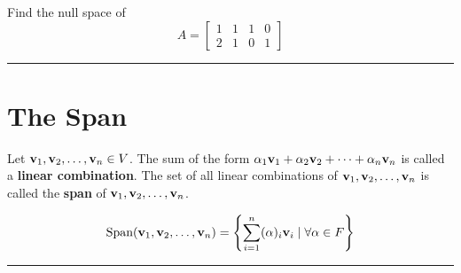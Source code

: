 \begin{example}
Find the null space of 
\[  
A = \begin{bmatrix}
1 & 1 & 1 & 0\\ 2 & 1 & 0 & 1
\end{bmatrix}
 \]

 \end{example}
	
	 
\rule[0.01in]{\textwidth}{0.0025in}


 









\section{The Span}

  \begin{definition}
Let ${\bf v}_1, {\bf v}_2, \dots, {\bf v}_n  \in V$.  The sum of the form $\alpha_1 {\bf v}_1 +  \alpha_2 {\bf v}_2 +  \cdots + \alpha_n {\bf v}_n$ is called a \textbf{linear combination}.  The set of all linear combinations of ${\bf v}_1, {\bf v}_2, \dots, {\bf v}_n$ is called the \textbf{span} of ${\bf v}_1, {\bf v}_2, \dots, {\bf v}_n$.



	\begin{tcolorbox}[colback=yellow!10!,colframe=gray!15!]

\[ \text{Span}({\bf v}_1, {\bf v}_2, \dots, {\bf v}_n) = \left\{ \sum_{i=1}^n (\alpha)_i {\bf v}_i \; | \; \forall  \alpha \in F    \right\}  \]
	 
	\end{tcolorbox}
	
\end{definition}
	
\rule[0.01in]{\textwidth}{0.0025in}







